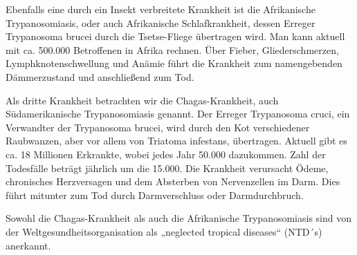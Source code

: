 \documentclass[11pt]{article}
\begin{document}
    Ebenfalls eine durch ein Insekt verbreitete Krankheit ist die Afrikanische Trypanosomiasis, oder auch Afrikanische Schlafkrankheit, dessen Erreger Trypanosoma brucei durch die Tsetse-Fliege übertragen wird.
    Man kann aktuell mit ca.
    500.000 Betroffenen in Afrika rechnen.
    Über Fieber, Gliederschmerzen, Lymphknotenschwellung und Anämie führt die Krankheit zum namengebenden Dämmerzustand und anschließend zum Tod.

    Als dritte Krankheit betrachten wir die Chagas-Krankheit, auch Südamerikanische Trypanosomiasis genannt.
    Der Erreger Trypanosoma cruci, ein Verwandter der Trypanosoma brucei, wird durch den Kot verschiedener Raubwanzen, aber vor allem von Triatoma infestans, übertragen.
    Aktuell gibt es ca.
    18 Millionen Erkrankte, wobei jedes Jahr 50.000 dazukommen.
    Zahl der Todesfälle beträgt jährlich um die 15.000.
    Die Krankheit verursacht Ödeme, chronisches Herzversagen und dem Absterben von Nervenzellen im Darm.
    Dies führt mitunter zum Tod durch Darmverschluss oder Darmdurchbruch.

    Sowohl die Chagas-Krankheit als auch die Afrikanische Trypanosomiasis sind von der Weltgesundheitsorganisation als „neglected tropical diseases“ (NTD´s) anerkannt.
\end{document}
